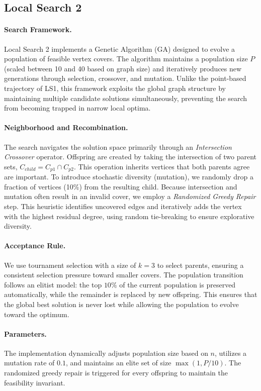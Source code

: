 \documentclass[sigconf]{acmart}
\begin{document}
\subsection{Local Search 2}
\paragraph{Search Framework.} Local Search 2 implements a Genetic
Algorithm (GA) designed to evolve a population of feasible vertex
covers. The algorithm maintains a population size $P$ (scaled
between 10 and 40 based on graph size) and iteratively produces new
generations through selection, crossover, and mutation. Unlike the
point-based trajectory of LS1, this framework exploits the global
graph structure by maintaining multiple candidate solutions
simultaneously, preventing the search from becoming trapped in
narrow local optima.

\paragraph{Neighborhood and Recombination.} The search navigates the
solution space primarily through an \emph{Intersection Crossover}
operator. Offspring are created by taking the intersection of two
parent sets, $C_{child} = C_{p1} \cap C_{p2}$. This operation
inherits vertices that both parents agree are important. To
introduce stochastic diversity (mutation), we randomly drop a
fraction of vertices (10\%) from the resulting child. Because
intersection and mutation often result in an invalid cover, we
employ a \emph{Randomized Greedy Repair} step. This heuristic
identifies uncovered edges and iteratively adds the vertex with the
highest residual degree, using random tie-breaking to ensure
explorative diversity.

\paragraph{Acceptance Rule.} We use tournament selection with a size
of $k=3$ to select parents, ensuring a consistent selection
pressure toward smaller covers. The population transition follows an
elitist model: the top $10\%$ of the current population is
preserved automatically, while the remainder is replaced by new
offspring. This ensures that the global best solution is never lost
while allowing the population to evolve toward the optimum.

\paragraph{Parameters.} The implementation dynamically adjusts
population size based on $n$, utilizes a mutation rate of $0.1$,
and maintains an elite set of size $\max(1, P/10)$. The randomized
greedy repair is triggered for every offspring to maintain the
feasibility invariant.
\end{document}
